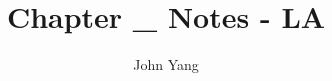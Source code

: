 \documentclass{article}
\title{Chapter \_ Notes - LA} %
\author{John Yang}
\begin{document}
    \maketitle
    \tableofcontents
    \section{} %
    \subsection{} %
\end{document}

